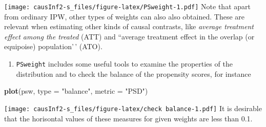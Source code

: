 \documentclass[
]{book}
\newenvironment{Shaded}{\begin{snugshade}}{\end{snugshade}}
\newcommand{\AttributeTok}[1]{\textcolor[rgb]{0.13,0.29,0.53}{#1}}
\newcommand{\CommentTok}[1]{\textcolor[rgb]{0.56,0.35,0.01}{\textit{#1}}}
\newcommand{\DecValTok}[1]{\textcolor[rgb]{0.00,0.00,0.81}{#1}}
\newcommand{\FunctionTok}[1]{\textcolor[rgb]{0.13,0.29,0.53}{\textbf{#1}}}
\newcommand{\NormalTok}[1]{#1}
\newcommand{\OtherTok}[1]{\textcolor[rgb]{0.56,0.35,0.01}{#1}}
\newcommand{\SpecialCharTok}[1]{\textcolor[rgb]{0.81,0.36,0.00}{\textbf{#1}}}
\newcommand{\StringTok}[1]{\textcolor[rgb]{0.31,0.60,0.02}{#1}}
\providecommand{\tightlist}{%
  \setlength{\itemsep}{0pt}\setlength{\parskip}{0pt}}
\begin{document}
\begin{Shaded}
\end{Shaded}

\texttt{[image: causInf2-s\_files/figure-latex/PSweight-1.pdf]}
Note that apart from ordinary IPW,
other types of weights can also also obtained. These
are relevant when estimating other kinds of causal contrasts,
like \emph{average treatment effect among the treated} (ATT) and ``average
treatment effect in the overlap (or equipoise) population'\,' (ATO).

\begin{enumerate}
\def\labelenumi{\arabic{enumi}.}
\setcounter{enumi}{1}
\tightlist
\item
  \texttt{PSweight} includes some useful tools to examine the
  properties of the distribution and to check the
  balance of the propensity scores, for instance
\end{enumerate}

\begin{Shaded}
\begin{Highlighting}[]
\FunctionTok{plot}\NormalTok{(psw, }\AttributeTok{type =} \StringTok{"balance"}\NormalTok{, }\AttributeTok{metric =} \StringTok{"PSD"}\NormalTok{)}
\end{Highlighting}
\end{Shaded}

\texttt{[image: causInf2-s\_files/figure-latex/check balance-1.pdf]}
It is desirable that the horisontal values of these measures for given
weights are less than 0.1.
\end{document}
